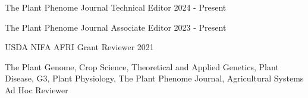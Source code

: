 
\begin{cventries}

  \cventry
    {The Plant Phenome Journal} %
    {Technical Editor} %
    {} %
    {2024 - Present} %
    {}

  \cventry
    {The Plant Phenome Journal} %
    {Associate Editor} %
    {} %
    {2023 - Present} %
    {}

    \cventry
      {USDA NIFA AFRI} %
      {Grant Reviewer} %
      {} %
      {2021} %
      {}
    
  \cventry
    {The Plant Genome, Crop Science, Theoretical and Applied Genetics, Plant Disease, G3, Plant Physiology, The Plant Phenome Journal, Agricultural Systems} %
    {Ad Hoc Reviewer} %
    {} %
    {} %
    {}

\end{cventries}
